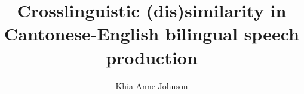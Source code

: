 \documentclass[gpscopy,onehalfspacing,12pt]{ubcdiss}
\title{Crosslinguistic (dis)similarity in {C}antonese-{E}nglish bilingual speech production}
\author{Khia Anne Johnson}
\begin{document}



% 

% 

% 






\textspacing		%

% 


\mainmatter

\acresetall	%

% 
\end{document}
